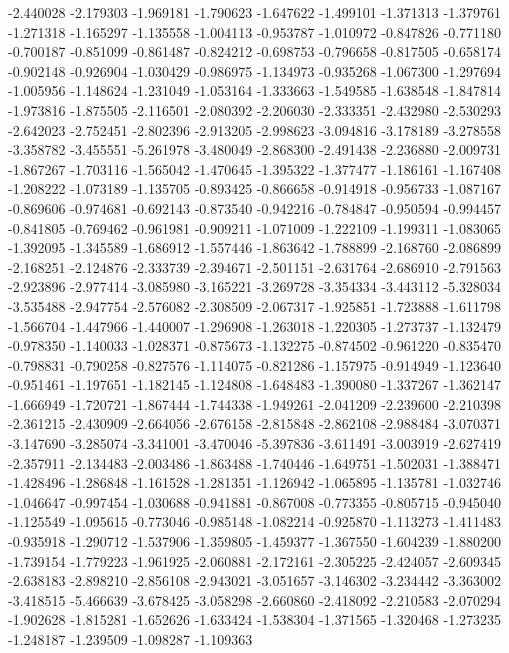 -2.440028
-2.179303
-1.969181
-1.790623
-1.647622
-1.499101
-1.371313
-1.379761
-1.271318
-1.165297
-1.135558
-1.004113
-0.953787
-1.010972
-0.847826
-0.771180
-0.700187
-0.851099
-0.861487
-0.824212
-0.698753
-0.796658
-0.817505
-0.658174
-0.902148
-0.926904
-1.030429
-0.986975
-1.134973
-0.935268
-1.067300
-1.297694
-1.005956
-1.148624
-1.231049
-1.053164
-1.333663
-1.549585
-1.638548
-1.847814
-1.973816
-1.875505
-2.116501
-2.080392
-2.206030
-2.333351
-2.432980
-2.530293
-2.642023
-2.752451
-2.802396
-2.913205
-2.998623
-3.094816
-3.178189
-3.278558
-3.358782
-3.455551
-5.261978
-3.480049
-2.868300
-2.491438
-2.236880
-2.009731
-1.867267
-1.703116
-1.565042
-1.470645
-1.395322
-1.377477
-1.186161
-1.167408
-1.208222
-1.073189
-1.135705
-0.893425
-0.866658
-0.914918
-0.956733
-1.087167
-0.869606
-0.974681
-0.692143
-0.873540
-0.942216
-0.784847
-0.950594
-0.994457
-0.841805
-0.769462
-0.961981
-0.909211
-1.071009
-1.222109
-1.199311
-1.083065
-1.392095
-1.345589
-1.686912
-1.557446
-1.863642
-1.788899
-2.168760
-2.086899
-2.168251
-2.124876
-2.333739
-2.394671
-2.501151
-2.631764
-2.686910
-2.791563
-2.923896
-2.977414
-3.085980
-3.165221
-3.269728
-3.354334
-3.443112
-5.328034
-3.535488
-2.947754
-2.576082
-2.308509
-2.067317
-1.925851
-1.723888
-1.611798
-1.566704
-1.447966
-1.440007
-1.296908
-1.263018
-1.220305
-1.273737
-1.132479
-0.978350
-1.140033
-1.028371
-0.875673
-1.132275
-0.874502
-0.961220
-0.835470
-0.798831
-0.790258
-0.827576
-1.114075
-0.821286
-1.157975
-0.914949
-1.123640
-0.951461
-1.197651
-1.182145
-1.124808
-1.648483
-1.390080
-1.337267
-1.362147
-1.666949
-1.720721
-1.867444
-1.744338
-1.949261
-2.041209
-2.239600
-2.210398
-2.361215
-2.430909
-2.664056
-2.676158
-2.815848
-2.862108
-2.988484
-3.070371
-3.147690
-3.285074
-3.341001
-3.470046
-5.397836
-3.611491
-3.003919
-2.627419
-2.357911
-2.134483
-2.003486
-1.863488
-1.740446
-1.649751
-1.502031
-1.388471
-1.428496
-1.286848
-1.161528
-1.281351
-1.126942
-1.065895
-1.135781
-1.032746
-1.046647
-0.997454
-1.030688
-0.941881
-0.867008
-0.773355
-0.805715
-0.945040
-1.125549
-1.095615
-0.773046
-0.985148
-1.082214
-0.925870
-1.113273
-1.411483
-0.935918
-1.290712
-1.537906
-1.359805
-1.459377
-1.367550
-1.604239
-1.880200
-1.739154
-1.779223
-1.961925
-2.060881
-2.172161
-2.305225
-2.424057
-2.609345
-2.638183
-2.898210
-2.856108
-2.943021
-3.051657
-3.146302
-3.234442
-3.363002
-3.418515
-5.466639
-3.678425
-3.058298
-2.660860
-2.418092
-2.210583
-2.070294
-1.902628
-1.815281
-1.652626
-1.633424
-1.538304
-1.371565
-1.320468
-1.273235
-1.248187
-1.239509
-1.098287
-1.109363
